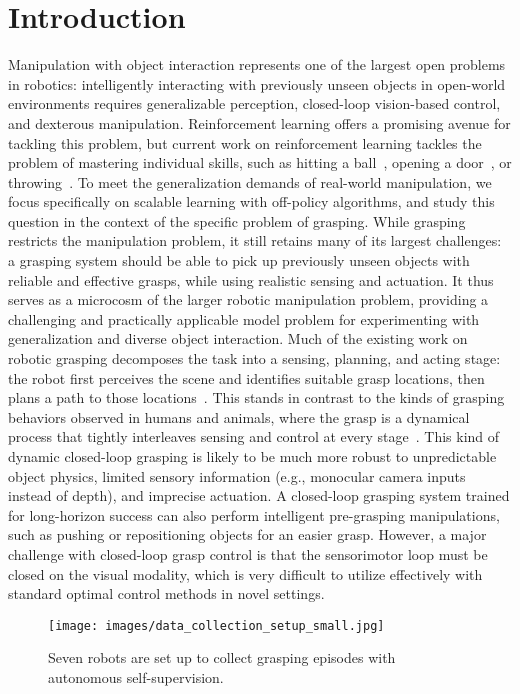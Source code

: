 \documentclass{article}
\begin{document}
\section{Introduction}
Manipulation with object interaction represents one of the largest open problems in robotics: intelligently interacting with previously unseen objects in open-world environments requires generalizable perception, closed-loop vision-based control, and dexterous manipulation. Reinforcement learning offers a promising avenue for tackling this problem, but current work on reinforcement learning tackles the problem of mastering individual skills, such as hitting a ball~\citep{peters_2008}, opening a door~\citep{kalakris11,yahya17}, or throwing~\citep{kth17}.
To meet the generalization demands of real-world manipulation, we focus specifically on scalable learning with off-policy algorithms, and study this question in the context of the specific problem of grasping.
While grasping restricts the manipulation problem, it still retains many of its largest challenges: a grasping system should be able to pick up previously unseen objects with reliable and effective grasps, while using realistic sensing and actuation. It thus serves as a microcosm of the larger robotic manipulation problem, providing a challenging and practically applicable model problem for experimenting with generalization and diverse object interaction.
Much of the existing work on robotic grasping decomposes the task into a sensing, planning, and acting stage: the robot first perceives the scene and identifies suitable grasp locations, then plans a path to those locations~\citep{zeng2018, juxi18, dexnet30_2017, platt_gpd_17}. This stands in contrast to the kinds of grasping behaviors observed in humans and animals, where the grasp is a dynamical process that tightly interleaves sensing and control at every stage~\citep{rodriguez2018icra, bohg2014}.
This kind of dynamic closed-loop grasping is likely to be much more robust to unpredictable object physics, limited sensory information (e.g., monocular camera inputs instead of depth), and imprecise actuation. A closed-loop grasping system trained for long-horizon success can also perform intelligent pre-grasping manipulations, such as pushing or repositioning objects for an easier grasp. However, a major challenge with closed-loop grasp control is that the sensorimotor loop must be closed on the visual modality, which is very difficult to utilize effectively with standard optimal control methods in novel settings.
\begin{wrapfigure}{r}{0.5\textwidth}
\vspace{-0.3cm}
 \texttt{[image: images/data\_collection\_setup\_small.jpg]}
\vspace{-0.4cm}
   \caption{Seven robots are set up to collect grasping episodes with autonomous self-supervision.}
\label{fig:teaser}
\vspace{-0.3cm}
\end{wrapfigure}
\end{document}

